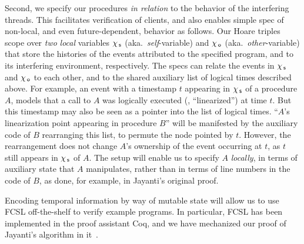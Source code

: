 Second, we specify our procedures \emph{in relation} to the behavior
of the interfering threads. This facilitates verification of clients,
and also enables simple spec of non-local, and even future-dependent,
behavior as follows. Our Hoare triples scope over \emph{two}
\emph{local} variables $\chi_{\, \mathsf{s}}$ (aka.~\emph{self}-variable) and
$\chi_{\, \mathsf{o}}$ (aka.~\emph{other}-variable) that store the histories of the
events attributed to the specified program, and to its interfering
environment, respectively. The specs can relate the events in $\chi_{\, \mathsf{s}}$
and $\chi_{\, \mathsf{o}}$ to each other, and to the shared auxiliary list of
logical times described above. For example, an event with a timestamp
$t$ appearing in $\chi_{\, \mathsf{s}}$ of a procedure $A$, models that a call to
$A$ was logically executed (\ie, ``linearized'') at time $t$. But
this timestamp may also be seen as a pointer into the list of logical
times. ``$A$'s linearization point appearing in procedure $B$'' will
be manifested by the auxiliary code of $B$ rearranging this list, to
permute the node pointed by $t$.
%
%
However, the rearrangement does not change $A$'s ownership of the
event occurring at $t$, as $t$ still appears in $\chi_{\, \mathsf{s}}$ of $A$. The
setup will enable us to specify $A$ \emph{locally}, in terms of
auxiliary state that $A$ manipulates, rather than in terms of line
numbers in the code of $B$, as done, for example, in Jayanti's
original proof.

%

Encoding temporal information by way of mutable state will allow us to
use FCSL off-the-shelf to verify example programs. In particular, FCSL
has been implemented in the proof assistant Coq, and we have
mechanized our proof of Jayanti's algorithm in it~\cite{CoqFiles}.

%

